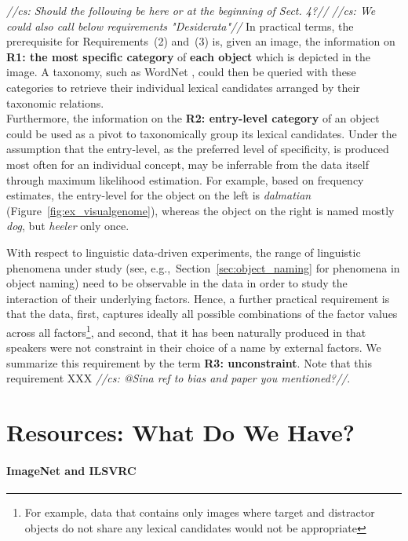 \documentclass[runningheads]{llncs}
\newcommand{\cs}[1]{\textcolor{PineGreen}{\emph{//cs: #1//}}}
\newcommand{\refexp}[1]{\textsl{#1}}
\begin{document}
\cs{Should the following be here or at the beginning of Sect. 4?}
\cs{We could also call below requirements "Desiderata"}
In practical terms, the prerequisite for Requirements~(2) and~(3) is, given an image, the information on \textbf{R1: the most specific category} of \textbf{each object} which is depicted in the image. 
A taxonomy, such as WordNet \cite{fellbaum1998wordnet}, could then be queried with these categories to retrieve their individual lexical candidates arranged by their taxonomic relations. \\
Furthermore, the information on the \textbf{R2: entry-level category} of an object could be used as a pivot to taxonomically group its lexical candidates.  
Under the assumption that the entry-level, as the preferred level of specificity, is produced most often for an individual concept, may be inferrable from the data itself through maximum likelihood estimation. 
For example, based on frequency estimates, the entry-level for the object on the left is \refexp{dalmatian} (Figure~\ref{fig:ex_visualgenome}), whereas the object on the right is named mostly \refexp{dog}, but \refexp{heeler} only once. 

With respect to linguistic data-driven experiments, the range of linguistic phenomena under study (see, e.g.,~Section~\ref{sec:object_naming} for phenomena in object naming) need to be observable in the data in order to study the interaction of their underlying factors. 
Hence, a further practical requirement is that the data, first, captures ideally all possible combinations of the factor values across all factors\footnote{For example, data that contains only images where target and distractor objects do not share any lexical candidates would not be appropriate}, and second, that it has been naturally produced in that speakers were not constraint in their choice of a name by external factors. 
We summarize this requirement by the term \textbf{R3: unconstraint}. 
Note that this requirement XXX \cs{@Sina ref to bias and paper you mentioned?}.



\section{Resources: What Do We Have?}
\label{sec:resources}
%

\paragraph{ImageNet and ILSVRC}
\end{document}
